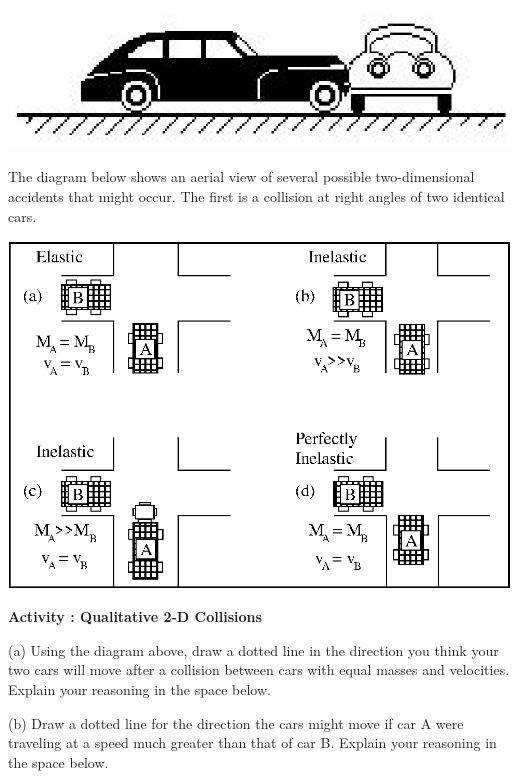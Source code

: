 \vspace{0.3cm}
{\par\centering \includegraphics{2Dcollisions/twod_collisions_fig1.eps} \par}
\vspace{0.3cm}

The diagram below shows an aerial view of several possible two-dimensional accidents
that might occur. The first is a collision at right angles of two identical
cars.

\vspace{0.3cm}
{\par\centering \includegraphics{2Dcollisions/twod_collisions_fig1b.eps} \par}
\vspace{0.3cm}

\textbf{Activity  : Qualitative 2-D Collisions }

(a) Using the diagram above, draw a dotted line in the direction you think your
two cars will move after a collision between cars with equal masses and velocities.
Explain your reasoning in the space below.
\vspace{20mm}

(b) Draw a dotted line for the direction the cars might move if car A were traveling
at a speed much greater than that of car B. Explain your reasoning in the space
below. 
\vspace{20mm}

